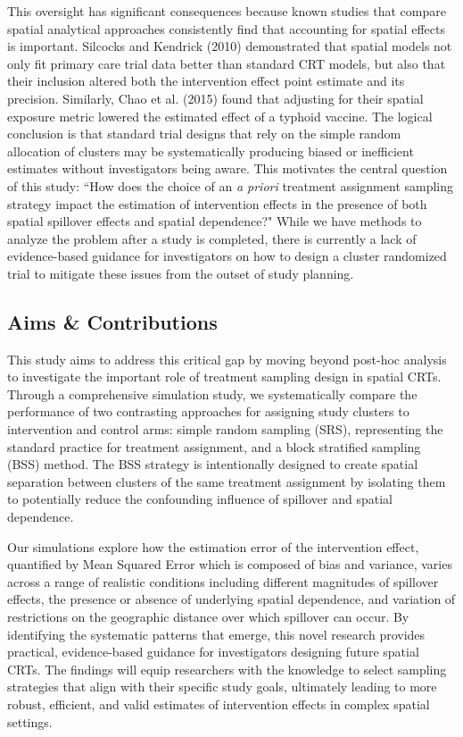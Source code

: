 \documentclass{article}[11pt]
\begin{document}
This oversight has significant consequences because known studies that compare spatial analytical approaches consistently find that accounting for spatial effects is important. Silcocks and Kendrick (2010) demonstrated that spatial models not only fit primary care trial data better than standard CRT models, but also that their inclusion altered both the intervention effect point estimate and its precision\cite{silcocks_spatial_2010}. Similarly, Chao et al. (2015) found that adjusting for their spatial exposure metric lowered the estimated effect of a typhoid vaccine\cite{chao_contribution_2015}. The logical conclusion is that standard trial designs that rely on the simple random allocation of clusters may be systematically producing biased or inefficient estimates without investigators being aware. This motivates the central question of this study: ``How does the choice of an \textit{a priori} treatment assignment sampling strategy impact the estimation of intervention effects in the presence of both spatial spillover effects and spatial dependence?" While we have methods to analyze the problem after a study is completed, there is currently a lack of evidence-based guidance for investigators on how to design a cluster randomized trial to mitigate these issues from the outset of study planning.

\subsection{Aims \& Contributions}

This study aims to address this critical gap by moving beyond post-hoc analysis to investigate the important role of treatment sampling design in spatial CRTs. Through a comprehensive simulation study, we systematically compare the performance of two contrasting approaches for assigning study clusters to intervention and control arms: simple random sampling (SRS), representing the standard practice for treatment assignment, and a block stratified sampling (BSS) method. The BSS strategy is intentionally designed to create spatial separation between clusters of the same treatment assignment by isolating them to potentially reduce the confounding influence of spillover and spatial dependence.

Our simulations explore how the estimation error of the intervention effect, quantified by Mean Squared Error which is composed of bias and variance, varies across a range of realistic conditions including different magnitudes of spillover effects, the presence or absence of underlying spatial dependence, and variation of restrictions on the geographic distance over which spillover can occur. By identifying the systematic patterns that emerge, this novel research provides practical, evidence-based guidance for investigators designing future spatial CRTs. The findings will equip researchers with the knowledge to select sampling strategies that align with their specific study goals, ultimately leading to more robust, efficient, and valid estimates of intervention effects in complex spatial settings.
\end{document}
